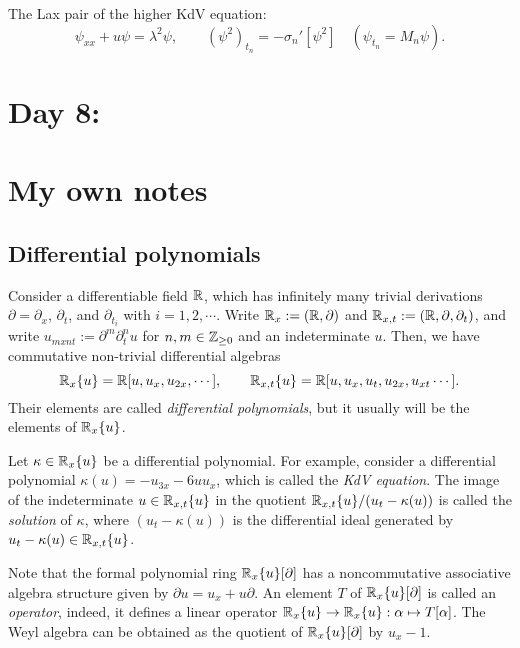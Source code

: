 \documentclass{../../../small}
\begin{document}
The Lax pair of the higher KdV equation:
\[\psi_{xx}+u\psi=\lambda^2\psi,\qquad (\psi^2)_{t_n}=-\sigma_n'[\psi^2]\quad(\psi_{t_n}=M_n\psi).\]



\newpage
\section{Day 8:}




\newpage

\section*{My own notes}

\subsection*{Differential polynomials}

\begin{prb}
Consider a differentiable field $\mathbb{R}$, which has infinitely many trivial derivations $\partial=\partial_x$, $\partial_t$, and $\partial_{t_i}$ with $i=1,2,\cdots$.
Write $\mathbb{R}_x:=(\mathbb{R},\partial)$ and $\mathbb{R}_{x,t}:=(\mathbb{R},\partial,\partial_t)$, and write $u_{mxnt}:=\partial^m\partial_t^nu$ for $n,m\in\mathbb{Z}_{\ge0}$ and an indeterminate $u$.
Then, we have commutative non-trivial differential algebras
\[\mathbb{R}_x\{u\}=\mathbb{R}[u,u_x,u_{2x},\cdots],\qquad\mathbb{R}_{x,t}\{u\}=\mathbb{R}[u,u_x,u_t,u_{2x},u_{xt}\cdots].\]
Their elements are called \emph{differential polynomials}, but it usually will be the elements of $\mathbb{R}_x\{u\}$.
\end{prb}

\begin{prb}
Let $\kappa\in\mathbb{R}_x\{u\}$ be a differential polynomial.
For example, consider a differential polynomial $\kappa(u)=-u_{3x}-6uu_x$, which is called the \emph{KdV equation}.
The image of the indeterminate $u\in\mathbb{R}_{x,t}\{u\}$ in the quotient $\mathbb{R}_{x,t}\{u\}/(u_t-\kappa(u))$ is called the \emph{solution} of $\kappa$, where $(u_t-\kappa(u))$ is the differential ideal generated by $u_t-\kappa(u)\in\mathbb{R}_{x,t}\{u\}$.
\end{prb}

\begin{prb}
Note that the formal polynomial ring $\mathbb{R}_x\{u\}[\partial]$ has a noncommutative associative algebra structure given by $\partial u=u_x+u\partial$.
An element $T$ of $\mathbb{R}_x\{u\}[\partial]$ is called an \emph{operator}, indeed, it defines a linear operator $\mathbb{R}_x\{u\}\to\mathbb{R}_x\{u\}:\alpha\mapsto T[\alpha]$.
The Weyl algebra can be obtained as the quotient of $\mathbb{R}_x\{u\}[\partial]$ by $u_x-1$.
\end{prb}
\end{document}
